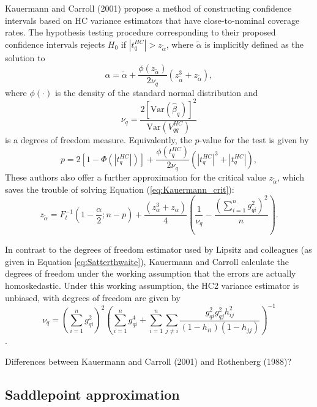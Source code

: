 \documentclass{article}\usepackage[]{graphicx}\usepackage[]{color}
\newcommand{\Var}{\text{Var}}
\begin{document}
Kauermann and Carroll (2001) propose a method of constructing confidence intervals based on HC variance estimators that have close-to-nominal coverage rates. The hypothesis testing procedure corresponding to their proposed confidence intervals rejects $H_0$ if $\left|t^{HC}_q\right| > z_{\tilde\alpha}$, where $\tilde\alpha$ is implicitly defined as the solution to \begin{equation}
\label{eq:Kauermann_crit}
\alpha = \tilde\alpha + \frac{\phi\left(z_{\tilde\alpha}\right)}{2 \nu_q}\left(z_{\tilde\alpha}^3 + z_{\tilde\alpha}\right), 
\end{equation}
where $\phi(\cdot)$ is the density of the standard normal distribution and \[
\nu_q  = \frac{2 \left[\Var(\hat\beta_q)\right]^2}{\Var\left(V^{HC}_{qq}\right)}\] 
is a degrees of freedom measure. Equivalently, the $p$-value for the test is given by \[
p = 2 \left[1 - \Phi\left(|t^{HC}_q|\right)\right] + \frac{\phi\left(t^{HC}_q\right)}{2 \nu_q}\left(\left|t^{HC}_q\right|^3 + \left|t^{HC}_q\right|\right), \]
These authors also offer a further approximation for the critical value $z_{\tilde\alpha}$, which saves the trouble of solving Equation (\ref{eq:Kauermann_crit}):
\[
z_{\tilde\alpha} = F_t^{-1}\left(1 - \frac{\alpha}{2}; n - p\right) + \frac{\left(z_\alpha^3 + z_\alpha\right)}{4}\left(\frac{1}{\nu_q} - \frac{\left(\sum_{i=1}^n g_{qi}^2\right)^2}{n}\right). \]

In contrast to the degrees of freedom estimator used by Lipsitz and colleagues (as given in Equation \ref{eq:Satterthwaite}), Kauermann and Carroll calculate the degrees of freedom under the working assumption that the errors are actually homoskedastic. Under this working assumption, the HC2 variance estimator is unbiased, with degrees of freedom are given by \[
\nu_q = \left(\sum_{i=1}^n g_{qi}^2\right)^2\left(\sum_{i=1}^n g_{qi}^4 + \sum_{i=1}^n \sum_{j \neq i} \frac{g_{qi}^2 g_{qj}^2 h_{ij}^2}{(1 - h_{ii})(1 - h_{jj})}\right)^{-1} \].

Differences between Kauermann and Carroll (2001) and Rothenberg (1988)?

\subsection{Saddlepoint approximation}
\end{document}
